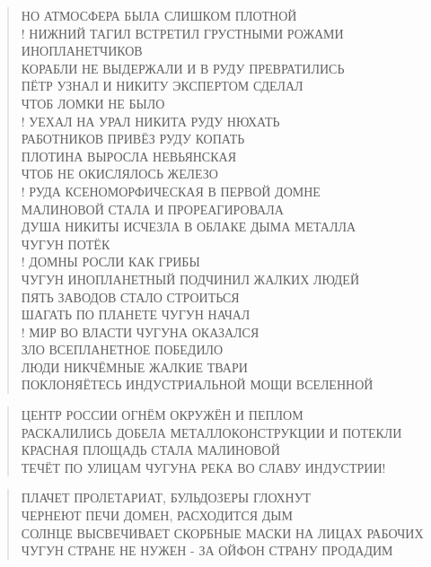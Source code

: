 \begin{verse}
НО АТМОСФЕРА БЫЛА СЛИШКОМ ПЛОТНОЙ\\!
НИЖНИЙ ТАГИЛ ВСТРЕТИЛ ГРУСТНЫМИ РОЖАМИ ИНОПЛАНЕТЧИКОВ\\
КОРАБЛИ НЕ ВЫДЕРЖАЛИ И В РУДУ ПРЕВРАТИЛИСЬ\\
ПЁТР УЗНАЛ И НИКИТУ ЭКСПЕРТОМ СДЕЛАЛ\\
ЧТОБ ЛОМКИ НЕ БЫЛО\\!
УЕХАЛ НА УРАЛ НИКИТА РУДУ НЮХАТЬ\\
РАБОТНИКОВ ПРИВЁЗ РУДУ КОПАТЬ\\
ПЛОТИНА ВЫРОСЛА НЕВЬЯНСКАЯ\\
ЧТОБ НЕ ОКИСЛЯЛОСЬ ЖЕЛЕЗО\\!
РУДА КСЕНОМОРФИЧЕСКАЯ В ПЕРВОЙ ДОМНЕ\\
МАЛИНОВОЙ СТАЛА И ПРОРЕАГИРОВАЛА\\
ДУША НИКИТЫ ИСЧЕЗЛА В ОБЛАКЕ ДЫМА МЕТАЛЛА\\
ЧУГУН ПОТЁК\\!
ДОМНЫ РОСЛИ КАК ГРИБЫ\\
ЧУГУН ИНОПЛАНЕТНЫЙ ПОДЧИНИЛ ЖАЛКИХ ЛЮДЕЙ\\
ПЯТЬ ЗАВОДОВ СТАЛО СТРОИТЬСЯ\\
ШАГАТЬ ПО ПЛАНЕТЕ ЧУГУН НАЧАЛ\\!
МИР ВО ВЛАСТИ ЧУГУНА ОКАЗАЛСЯ\\
ЗЛО ВСЕПЛАНЕТНОЕ ПОБЕДИЛО\\
ЛЮДИ НИКЧЁМНЫЕ ЖАЛКИЕ ТВАРИ\\
ПОКЛОНЯЁТЕСЬ ИНДУСТРИАЛЬНОЙ МОЩИ ВСЕЛЕННОЙ
\end{verse}

\poemtitle{***}
\begin{verse}
ЦЕНТР РОССИИ ОГНЁМ ОКРУЖЁН И ПЕПЛОМ\\
РАСКАЛИЛИСЬ ДОБЕЛА МЕТАЛЛОКОНСТРУКЦИИ И ПОТЕКЛИ\\
КРАСНАЯ ПЛОЩАДЬ СТАЛА МАЛИНОВОЙ\\
ТЕЧЁТ ПО УЛИЦАМ ЧУГУНА РЕКА ВО СЛАВУ ИНДУСТРИИ!
\end{verse}

\poemtitle{***}
\begin{verse}
ПЛАЧЕТ ПРОЛЕТАРИАТ, БУЛЬДОЗЕРЫ ГЛОХНУТ\\
ЧЕРНЕЮТ ПЕЧИ ДОМЕН, РАСХОДИТСЯ ДЫМ\\
СОЛНЦЕ ВЫСВЕЧИВАЕТ СКОРБНЫЕ МАСКИ НА ЛИЦАХ РАБОЧИХ\\
ЧУГУН СТРАНЕ НЕ НУЖЕН - ЗА ОЙФОН СТРАНУ ПРОДАДИМ
\end{verse}

